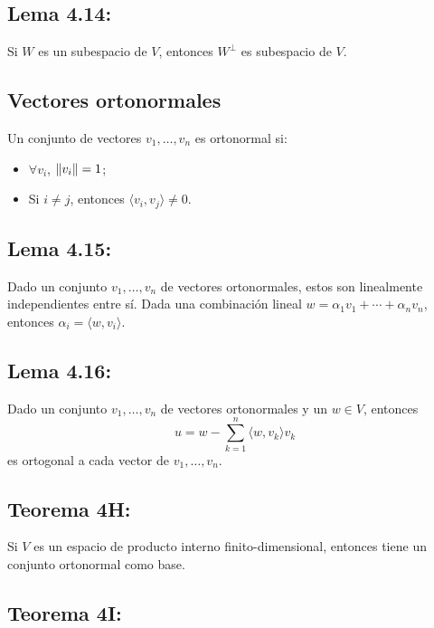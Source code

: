 \documentclass{article}
\begin{document}
\subsection*{\color{blue} Lema 4.14:}

Si $W$ es un subespacio de $V$, entonces $W^{\perp}$ es subespacio de $V$.

\subsection*{\color{violet} Vectores ortonormales}

Un conjunto de vectores $v_1,\ldots,v_n$ es ortonormal si:
\begin{itemize}
\item $\forall v_i$, $\norm{v_i}=1$;

\item Si $i\neq j$, entonces $\langle v_i,v_j\rangle\neq0$.
\end{itemize}

\subsection*{\color{blue} Lema 4.15:}

Dado un conjunto $v_1,\ldots,v_n$ de vectores ortonormales, estos son linealmente independientes entre sí. Dada una combinación lineal $w=\alpha_1v_1+\cdots+\alpha_nv_n$, entonces $\alpha_i=\langle w,v_i\rangle$.

\subsection*{\color{blue} Lema 4.16:}

Dado un conjunto $v_1,\ldots,v_n$ de vectores ortonormales y un $w\in V$, entonces
$$u=w-\sum_{k=1}^n \langle w,v_k\rangle v_k$$
es ortogonal a cada vector de $v_1,\ldots,v_n$.

\subsection*{\color{red} Teorema 4H:}

Si $V$ es un espacio de producto interno finito-dimensional, entonces tiene un conjunto ortonormal como base.

\subsection*{\color{red} Teorema 4I:}
\end{document}
